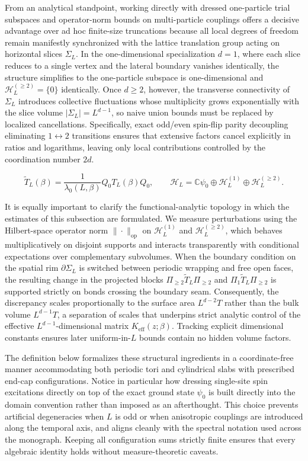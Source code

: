 \documentclass[11pt]{article}
\theoremstyle{definition}
\begin{document}
From an analytical standpoint, working directly with dressed one-particle trial
subspaces and operator-norm bounds on multi-particle couplings offers a decisive
advantage over ad hoc finite-size truncations because all local degrees of freedom
remain manifestly synchronized with the lattice translation group acting on
horizontal slices $\Sigma_L$. In the one-dimensional specialization $d = 1$, where
each slice reduces to a single vertex and the lateral boundary vanishes identically,
the structure simplifies to the one-particle subspace is one-dimensional and
$\mathcal{H}_L^{(\ge 2)} = \{0\}$ identically. Once $d \ge 2$, however, the
transverse connectivity of $\Sigma_L$ introduces collective fluctuations whose
multiplicity grows exponentially with the slice volume $|\Sigma_L| = L^{d-1}$, so
naive union bounds must be replaced by localized cancellations. Specifically, exact
odd/even spin-flip parity decoupling eliminating $1 \leftrightarrow 2$ transitions
ensures that extensive factors cancel explicitly in ratios and logarithms, leaving
only local contributions controlled by the coordination number $2d$.

\[
  \widetilde{T}_L(\beta) = \frac{1}{\lambda_0(L, \beta)} Q_0 T_L(\beta) Q_0, \qquad \mathcal{H}_L = \mathbb{C}\psi_0 \oplus \mathcal{H}_L^{(1)} \oplus \mathcal{H}_L^{(\ge 2)}.
\]

It is equally important to clarify the functional-analytic topology in which the
estimates of this subsection are formulated. We measure perturbations using the
Hilbert-space operator norm $\|\cdot\|_{\mathrm{op}}$ on $\mathcal{H}_L^{(1)}$ and
$\mathcal{H}_L^{(\ge 2)}$, which behaves multiplicatively on disjoint supports and
interacts transparently with conditional expectations over complementary subvolumes.
When the boundary condition on the spatial rim $\partial \Sigma_L$ is switched
between periodic wrapping and free open faces, the resulting change in the projected
blocks $\Pi_{\ge 2} \widetilde{T}_L \Pi_{\ge 2}$ and $\Pi_1 \widetilde{T}_L \Pi_{\ge
2}$ is supported strictly on bonds crossing the boundary seam. Consequently, the
discrepancy scales proportionally to the surface area $L^{d-2} T$ rather than the
bulk volume $L^{d-1} T$, a separation of scales that underpins strict analytic
control of the effective $L^{d-1}$-dimensional matrix $K_{\mathrm{eff}}(z; \beta)$.
Tracking explicit dimensional constants ensures later uniform-in-$L$ bounds contain
no hidden volume factors.

The definition below formalizes these structural ingredients in a coordinate-free
manner accommodating both periodic tori and cylindrical slabs with prescribed
end-cap configurations. Notice in particular how dressing single-site spin
excitations directly on top of the exact ground state $\psi_0$ is built directly
into the domain convention rather than imposed as an afterthought. This choice
prevents artificial degeneracies when $L$ is odd or when anisotropic couplings are
introduced along the temporal axis, and aligns cleanly with the spectral notation
used across the monograph. Keeping all configuration sums strictly finite ensures
that every algebraic identity holds without measure-theoretic caveats.
\end{document}
